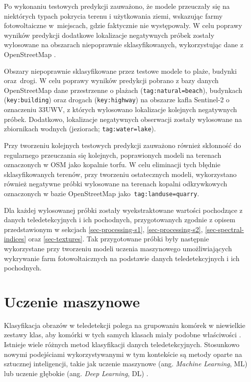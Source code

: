 \documentclass{amuthesis}
\begin{document}
Po wykonaniu testowych predykcji zauważono, że modele przeuczały się na
niektórych typach pokrycia terenu i użytkowania ziemi, wskazując farmy
fotowoltaiczne w~miejscach, gdzie faktycznie nie występowały. W celu
poprawy wyników predykcji dodatkowe lokalizacje negatywnych próbek
zostały wylosowane na obszarach niepoprawnie sklasyfikowanych,
wykorzystując dane z OpenStreetMap \autocite{OpenStreetMap}.

Obszary niepoprawnie sklasyfikowane przez testowe modele to plaże,
budynki oraz~drogi. W celu poprawy wyników predykcji pobrano z bazy
danych OpenStreetMap dane przestrzenne o plażach
(\texttt{tag:natural=beach}), budynkach (\texttt{key:building}) oraz
drogach (\texttt{key:highway}) na obszarze kafla Sentinel-2 o oznaczeniu
33UWV, z których wylosowano lokalizacje kolejnych negatywnych próbek.
Dodatkowo, lokalizacje negatywnych obserwacji zostały wylosowane na
zbiornikach wodnych (jeziorach; \texttt{tag:water=lake}).

Przy tworzeniu kolejnych testowych predykcji zauważono również skłonność
do regularnego przeuczania się kolejnych, poprawionych modeli na
terenach oznaczonych w OSM jako kopalnie torfu. W celu eliminacji tych
błędnie sklasyfikowanych terenów, przy tworzeniu ostatecznych modeli,
wykorzystano również negatywne próbki wylosowane na terenach kopalni
odkrywkowych oznaczonych w bazie OpenStreetMap
jako~\texttt{tag:landuse=quarry}.

Dla każdej wylosowanej próbki zostały wyekstraktowane wartości
pochodzące z danych teledetekcyjnych i ich pochodnych, przygotowanych
zgodnie z opisem przedstawionym w sekcjach \ref{sec-processing-s1},
\ref{sec-processing-s2}, \ref{sec-spectral-indices} oraz
\ref{sec-textures}. Tak przygotowane próbki były następnie wykorzystane
przy tworzeniu modeli uczenia maszynowego umożliwiających wykrywanie
farm fotowoltaicznych na podstawie danych teledetekcyjnych i ich
pochodnych.

\hypertarget{sec-machine-learning}{%
\section{Uczenie maszynowe}\label{sec-machine-learning}}

Klasyfikacja obrazów w teledetekcji polega na grupowaniu komórek w
niewielkie zestawy klas, aby komórki w tych samych klasach miały podobne
właściwości \autocite{ismail_2009_classification}. Istnieje wiele
różnych metod klasyfikacji danych teledetekcyjnych. Stosunkowo nowymi
podejściami wykorzystywanymi w tym kontekście są metody oparte na
sztucznej inteligencji, takie jak uczenie maszynowe (ang. \emph{Machine
Learning}, ML) lub uczenie głębokie (ang. \emph{Deep Learning}, DL)
\autocite{hejmanowska_2020_dane}.
\end{document}
